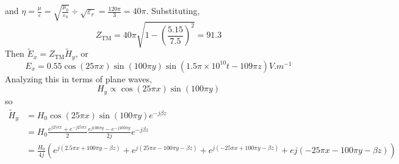 \documentclass[12pt]{article}
\begin{document}
\begin{ex}
    and $\eta = \frac{\mu}{\varepsilon} = \sqrt{\frac{\mu_0}{\varepsilon_0}} \div \sqrt{\varepsilon_r} = \frac{120\pi}{3} = 40\pi$. Substituting,
    $$Z_{\text{TM}} = 40\pi\sqrt{1 - \left(\frac{5.15}{7.5}\right)^2} = 91.3$$
    Then $\tilde E_x = Z_{\text{TM}}\tilde H_y$, or
    $$E_x = 0.55 \cos(25\pi x)\sin(100\pi y)\sin(1.5\pi \times 10^{10}t - 109\pi z)\unit{V.m^{-1}}$$
    Analyzing this in terms of plane waves,
    $$H_y \propto \cos(25\pi x)\sin(100\pi y)$$
    so
    \begin{align*}
        \tilde H_y &= H_0\cos(25\pi x)\sin(100\pi y)e^{-j\beta z} \\
                   &= H_0 \frac{e^{j25\pi x} + e^{-j25\pi x}}{2} \frac{e^{j100\pi y} - e^{-j100\pi y}}{2j} e^{-j\beta z} \\
                   &= \frac{H_0}{4j} \left(e^{j(2.5\pi x + 100\pi y - \beta z)} + e^{j(25\pi x - 100\pi y - \beta z)} + e^{j(-25\pi x + 100\pi y - \beta z)} + e{j(-25\pi x - 100\pi y - \beta z)}\right)
    \end{align*}
\end{ex}
\end{document}
